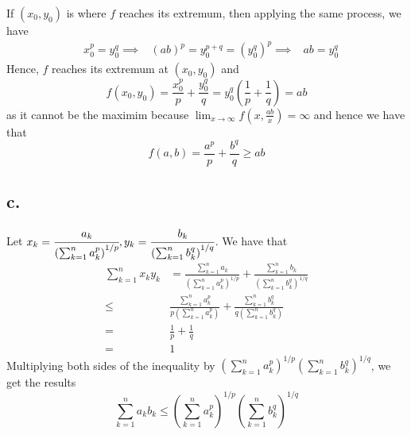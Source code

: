 \documentclass[11pt]{article}
\begin{document}
If $(x_0,y_0)$ is where $f$ reaches its extremum, then applying the same process, we have
\begin{equation*}
    \begin{aligned}
        &x_0^p = y_0^q
        \implies & (ab)^p = y_0^{p+q} = (y_0^q)^p
        \implies & ab = y_0^q
    \end{aligned}
\end{equation*}
Hence, $f$ reaches its extremum at $(x_0,y_0)$ and 
\[
    f(x_0,y_0) =  \frac{x_0^p}{p} + \frac{y_0^q}{q} = y_0^q\left(\frac{1}{p} + \frac{1}{q}\right) = ab
\]
as it cannot be the maximim because $\lim_{x \to \infty} f(x,\frac{ab}{x}) = \infty $
and hence we have that 
\[
    f(a,b) = \frac{a^p}{p}+\frac{b^q}{q} \ge ab    
\]
\subsection*{c.}
Let $x_k = \cfrac{a_k}{\left(\sum_{k=1}^n a_k^p \right)^{1/p}}, y_k = \cfrac{b_k}{\left(\sum_{k=1}^n b_k^q \right)^{1/q}}$.
We have that 
\begin{equation*}
    \begin{aligned}
        \sum_{k=1}^n x_ky_k &= \frac{\sum_{k=1}^n a_k}{\left(\sum_{k=1}^n a_k^p \right)^{1/p}} 
        + \frac{\sum_{k=1}^n b_k}{\left(\sum_{k=1}^n b_k^q \right)^{1/q}}  \\
        \le & \frac{\sum_{k=1}^n a_k^p}{p\left(\sum_{k=1}^n a_k^p \right)} 
        + \frac{\sum_{k=1}^n b_k^q}{q\left(\sum_{k=1}^n b_k^q \right)}  \\
        =& \frac{1}{p} + \frac{1}{q} \\
        =& 1
    \end{aligned}
\end{equation*}
Multiplying both sides of the inequality by $\left(\sum_{k=1}^n a_k^p \right)^{1/p}\left(\sum_{k=1}^n b_k^q \right)^{1/q}$, we get the results 
\[
    \sum_{k=1}^n a_kb_k \le \left(\sum_{k=1}^n a_k^p \right)^{1/p}\left(\sum_{k=1}^n b_k^q \right)^{1/q}    
\]
\end{document}
